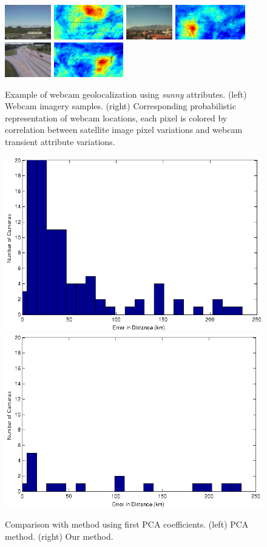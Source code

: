 \documentclass[10pt,twocolumn,letterpaper]{article}
\begin{document}
\begin{figure}
	\centering
		\includegraphics[width=0.18\textwidth]{figs/geoloc/297}
		\includegraphics[width=0.27\textwidth]{figs/geoloc/geoloc_8_297}
		\includegraphics[width=0.18\textwidth]{figs/geoloc/5207}
		\includegraphics[width=0.27\textwidth]{figs/geoloc/geoloc_24_5207}
		\includegraphics[width=0.18\textwidth]{figs/geoloc/23573}
		\includegraphics[width=0.27\textwidth]{figs/geoloc/geoloc_152_23573}
		\caption{Example of webcam geolocalization using
          \textit{sunny} attributes. (left) Webcam imagery
          samples. (right) Corresponding probabilistic representation
          of webcam locations, each pixel is colored by correlation
          between satellite image pixel variations and webcam
          transient attribute variations.}
		\label{fig:geoloc}
\end{figure}

\begin{figure}
  \centering
  \includegraphics[width=.235\textwidth]{figs/geoloc/tran_errors}
  \includegraphics[width=.235\textwidth]{figs/geoloc/pca_errors}
  \caption{Comparison with method using first PCA coefficients. (left)
    PCA method. (right) Our method.}
  \label{fig:locerror}
\end{figure}
\end{document}
